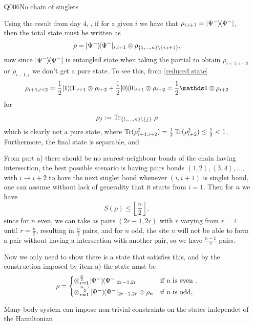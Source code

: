 \begin{entry}{Q006}{No chain of singlets}
\begin{solution}[Part (a)]
Using the result from day 4, , if for a given $i$ we have that $\rho_{i,i+1}=\lvert \Psi^{-} \rangle\!\langle \Psi^{-} \rvert$, then the total state must be written as \begin{equation}
    \rho = \lvert \Psi^{-} \rangle\!\langle \Psi^{-} \rvert_{i,i+1} \otimes \rho_{\{1,\dots,n\}\setminus\{i,i+1\}},
    \label{reduced state}
\end{equation} now since $\lvert \Psi^{-} \rangle\!\langle \Psi^{-} \rvert$ is entangled state when taking the partial to obtain $\rho_{i+1,i+2}$ or $\rho_{i-1,i}$ we don't get a pure state. To see this, from \eqref{reduced state}
\begin{equation}
    \rho_{i+1,i+2} = \frac{1}{2}\proj{1}_{i+1} \otimes \rho_{i+2} + \frac{1}{2}\proj{0}_{i+1} \otimes \rho_{i+2} = \frac{1}{2} \id \otimes \rho_{i+2} 
\end{equation}
for 
\[
  \rho_{j}:=\operatorname{Tr}_{\{1,\dots,n\}\setminus\{j\}}\,\rho
\]
which is clearly not a pure state, where $\operatorname{Tr}(\rho_{i+1,i+2}^2) = \frac{1}{2}\operatorname{Tr}(\rho_{i+2}^2) \leq \frac{1}{2} < 1$. Furthermore, the final state is separable, and 


\end{solution}

\begin{solution}[Part (b)]

From part a) there should be no nearest-neighbour bonds of the chain having intersection, the best possible scenario is having pairs bonds $(1,2),(3,4),...$, with $i\rightarrow i+2$ to have the next singlet bond whenever $(i,i+1)$ is singlet bond, one can assume without lack of generality that it starts from $i=1$. Then for $n$ we have 
$$S(\rho) \leq \left\lfloor \frac{n}{2} \right\rfloor,$$
since for $n$ even, we can take as pairs $(2r-1,2r)$ with $r$ varying from $r=1$ until $r=\frac{n}{2}$, resulting in $\frac{n}{2}$ pairs, and for $n$ odd, the site $n$ will not be able to form a pair without having a intersection with another pair, so we have $\frac{n-1}{2}$ pairs.

Now we only need to show there is a state that satisfies this, and by the construction imposed by item a) the state must be 
\begin{equation}
    \rho =  \begin{cases} 
\otimes_{r=1}^{\frac{n}{2}} \lvert \Psi^{-} \rangle\!\langle \Psi^{-} \rvert_{2r-1,2r} & \text{if } n \text{ is even }, \\
\otimes_{r=1}^{\frac{n-1}{2}} \lvert \Psi^{-} \rangle\!\langle \Psi^{-} \rvert_{2r-1,2r} \otimes \rho_n & \text{if } n \text{ is odd},
\end{cases} 
\end{equation}

\end{solution}

\begin{takeaway}
Many-body system can impose non-trivial constraints on the states independet of the Hamiltonian
\end{takeaway}


\end{entry}
